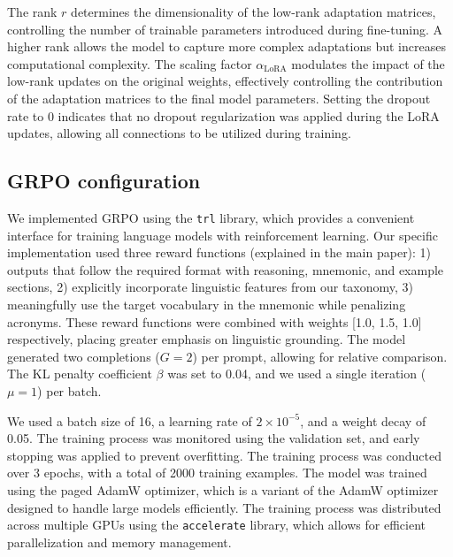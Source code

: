The rank \( r \) determines the dimensionality of the low-rank adaptation matrices, controlling the number of trainable parameters introduced during fine-tuning. A higher rank allows the model to capture more complex adaptations but increases computational complexity. The scaling factor \( \alpha_{\text{LoRA}} \) modulates the impact of the low-rank updates on the original weights, effectively controlling the contribution of the adaptation matrices to the final model parameters. Setting the dropout rate to 0 indicates that no dropout regularization was applied during the LoRA updates, allowing all connections to be utilized during training.


\subsection{GRPO configuration} \label{app:grpo-config}

We implemented GRPO using the \texttt{trl} library, which provides a convenient interface for training language models with reinforcement learning. Our specific implementation used three reward functions (explained in the main paper): 1) outputs that follow the required format with reasoning, mnemonic, and example sections, 2) explicitly incorporate linguistic features from our taxonomy, 3) meaningfully use the target vocabulary in the mnemonic while penalizing acronyms. These reward functions were combined with weights [1.0, 1.5, 1.0] respectively, placing greater emphasis on linguistic grounding. The model generated two completions ($G=2$) per prompt, allowing for relative comparison. The KL penalty coefficient $\beta$ was set to 0.04, and we used a single iteration ($\mu=1$) per batch.

We used a batch size of 16, a learning rate of \(2 \times 10^{-5}\), and a weight decay of 0.05. The training process was monitored using the validation set, and early stopping was applied to prevent overfitting. The training process was conducted over 3 epochs, with a total of 2000 training examples. The model was trained using the paged AdamW optimizer, which is a variant of the AdamW optimizer designed to handle large models efficiently. The training process was distributed across multiple GPUs using the \verb|accelerate| library, which allows for efficient parallelization and memory management.
